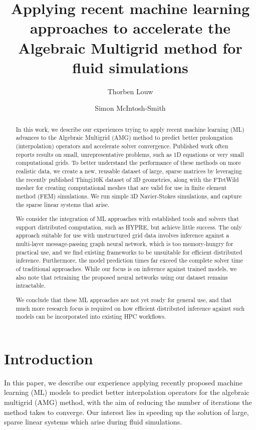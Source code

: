 \documentclass{svproc}
\title{Applying recent machine learning approaches to accelerate the Algebraic Multigrid method for fluid simulations}
\author{Thorben Louw \and Simon McIntosh-Smith}
\institute{
Dept. of Computer Science,
University of Bristol, 
Bristol, BS8~1UB, United~Kingdom
\email{thorben.louw.2019@bristol.ac.uk}           
\and
Dept. of Computer Science,
University of Bristol,
Bristol, BS8~1UB, United~Kingdom,
\email{S.McIntosh-Smith@bristol.ac.uk} 
}
\begin{document}
\maketitle



\begin{abstract}
In this work, we describe our experiences trying to apply recent machine learning (ML) advances to the Algebraic Multigrid (AMG) method to predict better prolongation (interpolation) operators and accelerate solver convergence. Published work often reports results on small, unrepresentative problems, such as 1D equations or very small computational grids. To better understand the performance of these methods on more realistic data, we create a new, reusable dataset of large, sparse matrices by leveraging the recently published Thingi10K dataset of 3D geometries, along with the FTetWild mesher for creating computational meshes  that  are  valid  for  use  in  finite  element  method  (FEM)  simulations.  We run simple 3D Navier-Stokes simulations, and capture the sparse linear systems that arise. 

We consider the integration of ML approaches with established tools and solvers that support distributed computation, such as HYPRE, but achieve little success. The only approach suitable for use with unstructured grid data involves inference against a multi-layer message-passing graph neural network, which is too memory-hungry for practical use, and we find existing frameworks to be unsuitable for efficient distributed inference. Furthermore, the model prediction times far exceed the complete solver time of traditional approaches. While our focus is on inference against trained models, we also note that retraining the proposed neural networks using our dataset remains intractable. 

We conclude that these ML approaches are not yet ready for general use, and that much more research focus is required on how efficient distributed inference against such models can be incorporated into existing HPC workflows.
\end{abstract}

\section{Introduction}

In this paper, we describe our experience applying recently proposed machine learning (ML) models to predict better interpolation operators for the algebraic multigrid (AMG) method, with the aim of reducing the number of iterations the method takes to converge. Our interest lies in speeding up the solution of large, sparse linear systems which arise during fluid simulations. 
\end{document}
